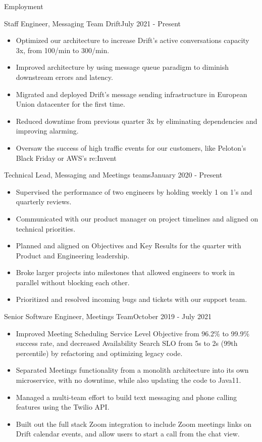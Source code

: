 \documentclass[]{mcdowellcv}
\begin{document}
	\begin{cvsection}{Employment}
		\begin{cvsubsection}{Staff Engineer, \normalfont Messaging Team }{Drift}{July 2021 - Present}
			\begin{itemize}
				\item Optimized our architecture to increase Drift's active conversations capacity 3x, from 100/min to 300/min.
				\item Improved architecture by using message queue paradigm to diminish downstream errors and latency.
				\item Migrated and deployed Drift's message sending infrastructure in European Union datacenter for the first time.
				\item Reduced downtime from previous quarter  3x by eliminating dependencies and improving alarming.
				\item Oversaw the success of high traffic events for our customers, like Peloton's Black Friday or AWS's re:Invent
			\end{itemize}
		\end{cvsubsection}
		\begin{cvsubsection2}{Technical Lead, \normalfont Messaging and Meetings teams}{January 2020 - Present}
			\begin{itemize}
				\item Supervised the performance of two engineers by holding weekly 1 on 1's and quarterly reviews.
				\item Communicated with our product manager on project timelines and aligned on technical priorities.
				\item Planned and aligned on Objectives and Key Results for the quarter with Product and Engineering leadership.
				\item Broke larger projects into milestones that allowed engineers to work in parallel without blocking each other.
				\item Prioritized and resolved incoming bugs and tickets with our support team.
			\end{itemize}
		\end{cvsubsection2}
		\begin{cvsubsection2}{Senior Software Engineer, \normalfont Meetings Team}{October 2019 - July 2021}		
			\begin{itemize}
				\item Improved Meeting Scheduling Service Level Objective from 96.2\% to 99.9\% success rate, and decreased Availability Search SLO from 5s to 2s (99th percentile) by refactoring and optimizing legacy code.
				\item Separated Meetings functionality from a monolith architecture into its own microservice, with no downtime, while also updating the code to Java11.
				\item Managed a multi-team effort to build text messaging and phone calling features using the Twilio API.   
				\item Built out the full stack Zoom integration to include Zoom meetings links on Drift calendar events, and allow users to start a call from the chat view.
			\end{itemize}
		\end{cvsubsection2}
		

\end{cvsection}
\end{document}
